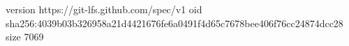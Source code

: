 version https://git-lfs.github.com/spec/v1
oid sha256:4039b03b326958a21d4421676fe6a0491f4d65c7678bee406f76cc24874dcc28
size 7069
